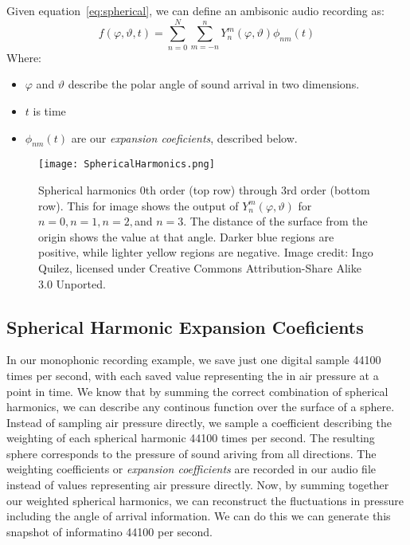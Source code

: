 Given equation~\ref{eq:spherical}, we can define an ambisonic
audio recording as:
\begin{equation}
f(\varphi,\vartheta,t)=\sum\limits_{n=0}^N\sum\limits_{m=-n}^nY_n^m(\varphi,\vartheta)\phi_{nm}(t)
\label{eq:ambisonics}
\end{equation}
Where:
\begin{itemize}
\item $\varphi$ and $\vartheta$ describe the polar angle of sound
  arrival in two dimensions.
\item $t$ is time
\item $\phi_{nm}(t)$ are our \textit{expansion coeficients}, described
  below.
\end{itemize}
\begin{figure}[]
  \texttt{[image: SphericalHarmonics.png]}
  \caption{Spherical harmonics $0$th order (top row) through $3$rd
    order (bottom row). This for image shows the output of
    $Y_{n}^{m}(\varphi,\vartheta)$ for $n=0,n=1,n=2,$and $n=3$. The
    distance of the surface from the origin shows the value at that
    angle. Darker blue regions are positive, while lighter yellow
    regions are negative. Image credit: Ingo Quilez, licensed under
    Creative Commons Attribution-Share Alike 3.0 Unported.}
  \label{fig:spherical-harmonics}
\end{figure}



\subsection{Spherical Harmonic Expansion Coeficients}
\label{sec:spher-harm-expans}
In our monophonic recording example, we save just one digital sample
44100 times per second, with each saved value representing the
in air pressure at a point in time. We know that by summing the correct
combination of spherical harmonics, we can describe any continous
function over the surface of a sphere. Instead of sampling air
pressure directly, we sample a coefficient describing the weighting of
each spherical harmonic 44100 times per second. The resulting sphere
corresponds to the pressure of sound ariving from all directions. The
weighting coefficients or \textit{expansion coefficients} are recorded
in our audio file instead of values representing air pressure
directly. Now, by summing together our weighted spherical harmonics,
we can reconstruct the fluctuations in pressure including the angle of
arrival information. We can do this we can generate this snapshot of
informatino 44100 per second.

